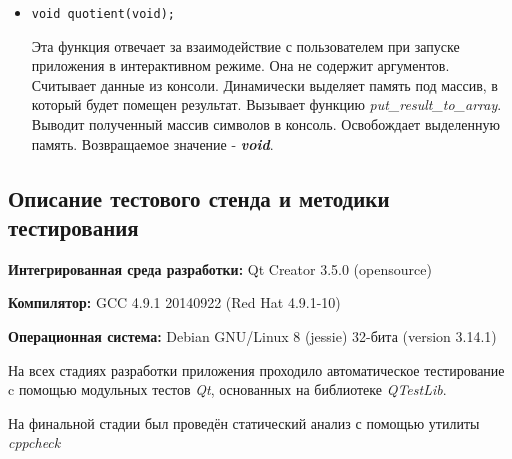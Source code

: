 \documentclass[12pt,a4paper]{report}
\begin{document}
\begin{enumerate}
\begin{itemize}
\item \verb-void quotient(void);-

Эта функция отвечает за взаимодействие с пользователем при запуске приложения в интерактивном режиме. Она не содержит аргументов. Считывает данные из консоли. Динамически выделяет память под массив, в который будет помещен результат. Вызывает функцию \textit{put\_result\_to\_array}. Выводит полученный массив символов в консоль. Освобождает выделенную память. Возвращаемое значение - \textit{\textbf{void}}.
\end{itemize}
\end{enumerate}
\subsection{Описание тестового стенда и методики тестирования}

\begin{flushleft}
\textbf{Интегрированная среда разработки:} Qt Creator 3.5.0 (opensource)

\textbf{Компилятор:} GCC 4.9.1 20140922 (Red Hat 4.9.1-10)

\textbf{Операционная система:} Debian GNU/Linux 8 (jessie) 32-бита (version 3.14.1)
\end{flushleft}

На всех стадиях разработки приложения проходило автоматическое тестирование c помощью модульных тестов \textit{Qt}, основанных на библиотеке  \textit{QTestLib}.

На финальной стадии был проведён статический анализ с помощью утилиты \textit{cppcheck}%
\end{document}
